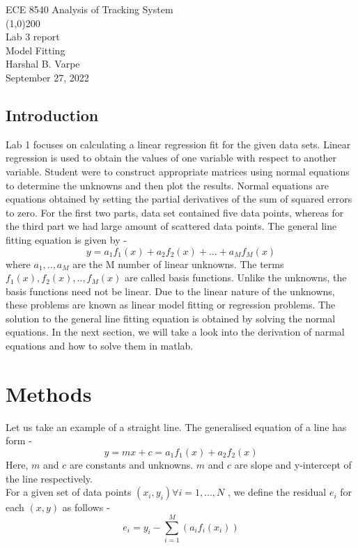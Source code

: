 \documentclass{article}
\begin{document}
\begin{titlepage}
	\begin{center}
	\LARGE{ECE 8540 Analysis of Tracking System}\\
	\line(1,0){200}\\
	[5mm]
	\Large{Lab 3 report}\\
	\Large{Model Fitting}\\
	[150mm]
	\large{Harshal B. Varpe}\\
	September 27, 2022
	\end{center}
\end{titlepage}

\begin{center}
\section{Introduction}\label{sec:intro}
\end{center}
Lab 1 focuses on calculating a linear regression fit for the given data sets. Linear regression is used to obtain the values of one variable with respect to another variable. Student were to construct appropriate matrices using normal equations to determine the unknowns and then plot the results. Normal equations are equations obtained by setting the partial derivatives of the sum of squared errors to zero. For the first two parts, data set contained five data points, whereas for the third part we had large amount of scattered data points.
The general line fitting equation is given by - 
\begin{equation}\label{eqn1}
y = a_1f_1(x)+a_2f_2(x)+...+a_Mf_M(x)
\end{equation}
where $a_1,..,a_M$ are the M number of linear unknowns. The terms $f_1(x),f_2(x),..,f_M(x)$ are called basis functions. Unlike the unknowns, the basis functions need not be linear. Due to the linear nature of the unknowns, these problems are known as linear model fitting or regression problems. The solution to the general line fitting equation is obtained by solving the normal equations. In the next section, we will take a look into the derivation of narmal equations and how to solve them in matlab.

\bigbreak


\section{\centering Methods}\label{sec:meth}


Let us take an example of a straight line. The generalised equation of a line has form - 
\begin{equation}\label{eqn2}
y = mx + c = a_1f_1(x)+a_2f_2(x)
\end{equation}
 Here, $m$ and $c$ are constants and unknowns. $m$ and $c$ are slope and y-intercept of the line respectively. \\
For a given set of data points $(x_i,y_i) \forall i = 1,...,N $ , we define the residual $e_i$ for each $ (x,y) $ as follows -
\begin{equation}\label{eqn3}
e_i = y_i - \sum_{i=1}^{M} (a_if_i(x_i))
\end{equation}
\end{document}
